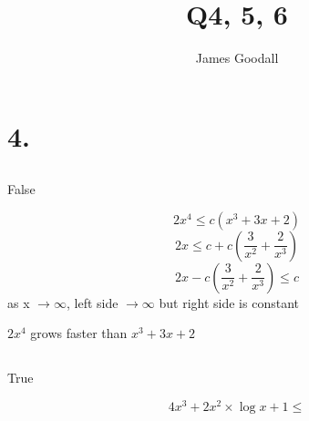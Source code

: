 \documentclass{article}
\author{James Goodall}
\title{Q4, 5, 6}
\begin{document}
\maketitle

\section{4.}
    \subsection{}

False

\[2x^4 \le c(x^3+3x+2)\]
\[2x \le c+c(\frac{3}{x^2}+\frac{2}{x^3})\]
\[2x- c(\frac{3}{x^2}+\frac{2}{x^3}) \le c\]
as x \(\to \infty\), left side \(\to \infty\) but right side is constant

\(2x^4\) grows faster than \(x^3+3x+2\)

    \subsection{}

True

\[4x^3+2x^2 \times \log{x}+1 \le \]
\end{document}
